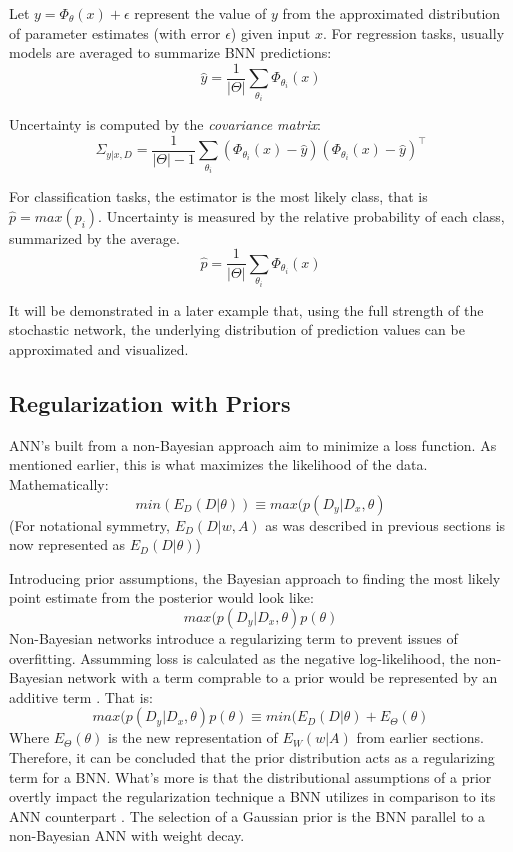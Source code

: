 Let $y = \Phi_{\theta} (x) + \epsilon$ represent the value of $y$ from the approximated distribution of parameter estimates (with error $\epsilon$) given input $x$.
For regression tasks, usually models are averaged to summarize BNN predictions: 
$$
\hat{y} = \frac{1}{|\Theta|} \sum_{\theta_i} \Phi_{\theta_i}(x)
$$

Uncertainty is computed by the \textit{covariance matrix}:
$$
\Sigma_{y|x,D} = \frac{1}{|\Theta|-1} \sum_{\theta_i} (\Phi_{\theta_i}(x) - \hat{y}) (\Phi_{\theta_i}(x) - \hat{y})^\intercal
$$

For classification tasks, the estimator is the most likely class, that is $\hat{p} = max(p_i)$.  Uncertainty is measured by the relative probability of each class, summarized by the average.
$$
\hat{p} = \frac{1}{|\Theta|} \sum_{\theta_i} \Phi_{\theta_i}(x)
$$

It will be demonstrated in a later example that, using the full strength of the stochastic network, the underlying distribution of prediction values can be approximated and visualized. \cite{ziyin2022stochastic}


\subsection{Regularization with Priors}


ANN's built from a non-Bayesian approach aim to minimize a loss function.  As mentioned earlier, this is what maximizes the likelihood of the data.  Mathematically:
$$
min(E_D(D|\theta)) \equiv max(p(D_y|D_x,\theta)
$$
(For notational symmetry, $E_D(D|w,A)$ as was described in previous sections is now represented as $E_D(D|\theta)$)

Introducing prior assumptions, the Bayesian approach to finding the most likely point estimate from the posterior would look like:
$$
 max(p(D_y|D_x,\theta)p(\theta)
$$
Non-Bayesian networks introduce a regularizing term to prevent issues of overfitting.  Assumming loss is calculated as the negative log-likelihood, the non-Bayesian network with a term comprable to a prior would be represented by an additive term \cite{Jospin}.  That is:
$$
 max(p(D_y|D_x,\theta)p(\theta) \equiv min(E_D(D|\theta) + E_{\Theta}(\theta)
$$
Where $E_{\Theta}(\theta)$ is the new representation of $E_W(w|A)$ from earlier sections.  Therefore, it can be concluded that the prior distribution acts as a regularizing term for a BNN.  What's more is that the distributional assumptions of a prior overtly impact the regularization technique a BNN utilizes in comparison to its ANN counterpart \cite{vladimirova2019understanding}.  The selection of a Gaussian prior %
is the BNN parallel to a non-Bayesian ANN with weight decay.








  

